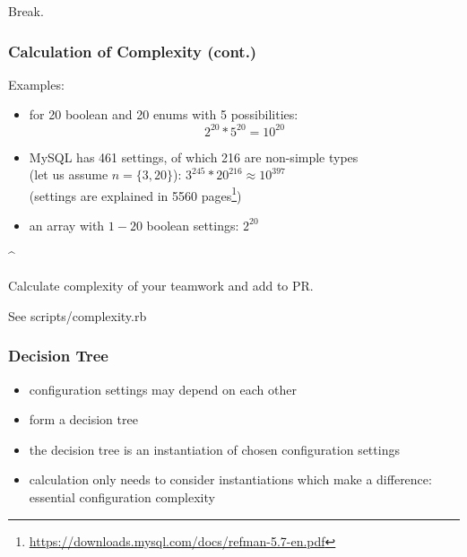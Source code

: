 \begin{assignment}
	\begin{task}
	Break.
	\end{task}
\end{assignment}


\begin{frame}
	\frametitle{Calculation of Complexity (cont.)}

	Examples:
	\begin{itemize}
	\item for 20 boolean and 20 enums with 5 possibilities:
	\pause
	$$2^{20}*5^{20} = 10^{20}$$

	\item MySQL has 461 settings, of which 216 are non-simple types~\cite{xu2015hey} \\ (let us assume $n=\{3,20\}$):
	\pause
	$3^{245} * 20^{216} \approx 10^{397}$ \\
	(settings are explained in 5560 pages\footnote{\url{https://downloads.mysql.com/docs/refman-5.7-en.pdf}})

	\item an array with $1-20$ boolean settings:
	\pause
	$2^{20}$
	\end{itemize}
\end{frame}
\lstMakeShortInline[postbreak=,keywordstyle={},showspaces=no]^

\begin{assignment}
	\begin{task}
	Calculate complexity of your teamwork and add to PR.
	\end{task}

	See scripts/complexity.rb
\end{assignment}

\begin{frame}
	\frametitle{Decision Tree}
	\begin{itemize}
	\item configuration settings may depend on each other
	\item form a decision tree~\cite{reiser2009cvm,czarnecki2012cool}
	\item the decision tree is an instantiation of chosen configuration settings
	\item calculation only needs to consider instantiations which make a difference: \\
	essential configuration complexity~\cite{meinicke2016essential}
	\end{itemize}
\end{frame}

